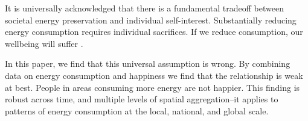 \documentclass[10pt, letterpaper]{article}
\begin{document}
\begin{spacing}{1.4}
It is universally acknowledged that there is a fundamental tradeoff between
societal energy preservation and individual self-interest. Substantially reducing
energy consumption requires individual sacrifices. If we reduce consumption, our wellbeing will
suffer \cite{kenny_businessweek_aug_29_14, gordon_wsj_may_29_14, carter_pbs_apr_18_77,smil05}. 






In this paper, we find that this universal assumption is wrong.  By combining
data on energy consumption and happiness we find that the
relationship is weak at best. %
 People in areas consuming more energy are not happier.
This finding is robust across time, and multiple levels of spatial aggregation--it applies to patterns of energy consumption  at the local, national, and global scale.  



\end{spacing}
\end{document}
